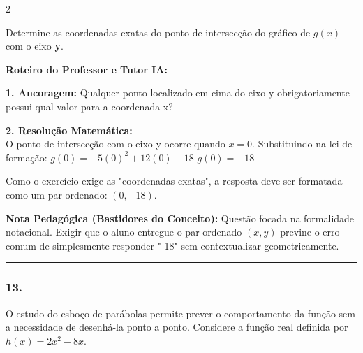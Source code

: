 \begin{multicols*}{2}
\begin{enunciadoLiteral}
Determine as coordenadas exatas do ponto de intersecção do gráfico de $g(x)$ com o eixo \textbf{y}.
\end{enunciadoLiteral}

\ifgabarito
    \begin{tcolorbox}[colback=CorTitUm!5, colframe=CorTitUm, boxrule=1pt, arc=4pt, left=6pt, right=6pt, top=6pt, bottom=6pt]
    \small\textbf{\textcolor{CorTitUm}{Roteiro do Professor e Tutor IA:}}\par\vspace{0.1cm}
    \color{CinzaEscuro}
    \textbf{1. Ancoragem:} Qualquer ponto localizado em cima do eixo y obrigatoriamente possui qual valor para a coordenada x?\par\vspace{0.1cm}
    \textbf{2. Resolução Matemática:}\\
    O ponto de intersecção com o eixo y ocorre quando $x = 0$.
    Substituindo na lei de formação:
    $g(0) = -5(0)^2 + 12(0) - 18$
    $g(0) = -18$
    
    Como o exercício exige as "coordenadas exatas", a resposta deve ser formatada como um par ordenado: $(0, -18)$.
    \end{tcolorbox}
    \vspace{0.15cm}
    
    \begin{boxexplicacao}
    \textbf{Nota Pedagógica (Bastidores do Conceito):} Questão focada na formalidade notacional. Exigir que o aluno entregue o par ordenado $(x, y)$ previne o erro comum de simplesmente responder "-18" sem contextualizar geometricamente.
    \end{boxexplicacao}
\fi

\par\vspace{\espacoQuestao}

\noindent\textcolor{CorLinha}{\rule{\linewidth}{0.5pt}} 
\par\vspace{\espacoPreQuestao}
\subsubsection*{13.} 
\begin{enunciadoLiteral}
O estudo do esboço de parábolas permite prever o comportamento da função sem a necessidade de desenhá-la ponto a ponto. Considere a função real definida por $h(x) = 2x^2 - 8x$.


\end{enunciadoLiteral}
\end{multicols*}
